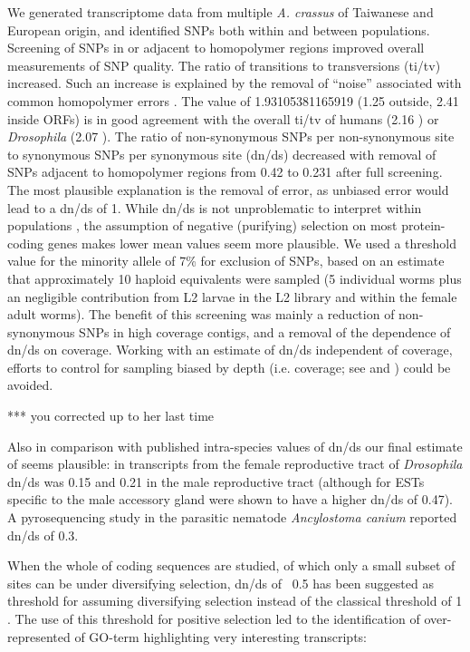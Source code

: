 \documentclass[10pt]{bmc_article}
\newenvironment{bmcformat}{\begin{raggedright}\baselineskip20pt\sloppy\setboolean{publ}{false}}{\end{raggedright}\baselineskip20pt\sloppy}
\begin{document}
\begin{bmcformat}
We generated transcriptome data from multiple \textit{A. crassus} of
Taiwanese and European origin, and identified SNPs both within and
between populations. Screening of SNPs in or adjacent to homopolymer
regions improved overall measurements of SNP quality. The ratio of
transitions to transversions (ti/tv) increased. Such an increase is
explained by the removal of “noise” associated with common homopolymer
errors \cite{pmid21685085}. The value of 1.93105381165919
(1.25 outside, 2.41 inside
ORFs) is in good agreement with the overall ti/tv of humans (2.16
\cite{pmid21169219}) or \textit{Drosophila} (2.07
\cite{pmid21143862}). The ratio of non-synonymous SNPs per
non-synonymous site to synonymous SNPs per synonymous site (dn/ds)
decreased with removal of SNPs adjacent to homopolymer regions from
0.42 to 0.231 after
full screening. The most plausible explanation is the removal of
error, as unbiased error would lead to a dn/ds of 1. While dn/ds is
not unproblematic to interpret within populations \cite{pmid19081788},
the assumption of negative (purifying) selection on most
protein-coding genes makes lower mean values seem more plausible. We
used a threshold value for the minority allele of 7\% for exclusion of
SNPs, based on an estimate that approximately 10 haploid equivalents
were sampled (5 individual worms plus an negligible contribution from
L2 larvae in the L2 library and within the female adult worms). The
benefit of this screening was mainly a reduction of non-synonymous
SNPs in high coverage contigs, and a removal of the dependence of
dn/ds on coverage. Working with an estimate of dn/ds independent of
coverage, efforts to control for sampling biased by depth
(i.e. coverage; see \cite{pmid18590545} and \cite{pmid20478048}) could
be avoided.

*** you corrected up to her last time

Also in comparison with published intra-species values of dn/ds our
final estimate of seems plausible: in transcripts from the female
reproductive tract of \textit{Drosophila} dn/ds was 0.15
\cite{pmid15579698} and 0.21 in the male reproductive tract
\cite{pmid11404480} (although for ESTs specific to the male accessory
gland were shown to have a higher dn/ds of 0.47). A pyrosequencing
study in the parasitic nematode \textit{Ancylostoma canium}
\cite{pmid20470405} reported dn/ds of 0.3.

When the whole of coding sequences are studied, of which only a small
subset of sites can be under diversifying selection, dn/ds of ~0.5 has
been suggested as threshold for assuming diversifying selection
\cite{pmid15579698} instead of the classical threshold of 1
\cite{pmid6449605}. The use of this threshold for positive selection
led to the identification of over-represented of GO-term highlighting
very interesting transcripts:


\end{bmcformat}
\end{document}
